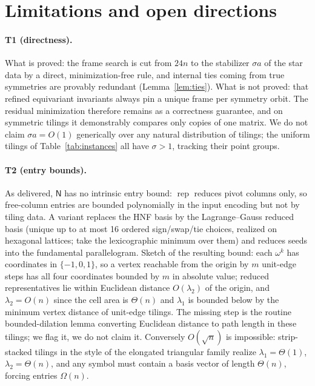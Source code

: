 \documentclass[11pt]{article}
\theoremstyle{definition}
\newcommand{\rep}{\operatorname{rep}}
\newcommand{\N}{\mathsf{N}}
\begin{document}
\section{Limitations and open directions}\label{sec:limits}

\paragraph{T1 (directness).} What is proved: the frame search is cut from $24n$ to the
stabilizer $\sigma a$ of the star data by a direct, minimization-free rule, and internal
ties coming from true symmetries are provably redundant (Lemma~\ref{lem:ties}). What is not
proved: that refined equivariant invariants always pin a unique frame per symmetry orbit.
The residual minimization therefore remains as a correctness guarantee, and on symmetric
tilings it demonstrably compares only copies of one matrix. We do not claim
$\sigma a=O(1)$ generically over any natural distribution of tilings; the uniform tilings
of Table~\ref{tab:instances} all have $\sigma>1$, tracking their point groups.

\paragraph{T2 (entry bounds).} As delivered, $\N$ has no intrinsic entry bound: $\rep$
reduces pivot columns only, so free-column entries are bounded polynomially in the input
encoding but not by tiling data. A variant replaces the HNF basis by the Lagrange--Gauss
reduced basis (unique up to at most 16 ordered sign/swap/tie choices, realized on hexagonal
lattices; take the lexicographic minimum over them) and reduces seeds into the fundamental
parallelogram. Sketch of the resulting bound: each $\omega^k$ has coordinates in
$\{-1,0,1\}$, so a vertex reachable from the origin by $m$ unit-edge steps has all four
coordinates bounded by $m$ in absolute value; reduced representatives lie within Euclidean
distance $O(\lambda_2)$ of the origin, and $\lambda_2=O(n)$ since the cell area is
$\Theta(n)$ and $\lambda_1$ is bounded below by the minimum vertex distance of unit-edge
tilings. The missing step is the routine bounded-dilation lemma converting Euclidean
distance to path length in these tilings; we flag it, we do not claim it. Conversely
$O(\sqrt n)$ is impossible: strip-stacked tilings in the style of the elongated triangular
family realize $\lambda_1=\Theta(1)$, $\lambda_2=\Theta(n)$, and any symbol must contain a
basis vector of length $\Theta(n)$, forcing entries $\Omega(n)$.
\end{document}

